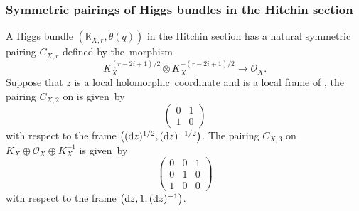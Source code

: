 \documentclass[10pt,a4paper]{amsart}
\numberwithin{equation}{section}
\newcommand{\strsheaf}{\mathcal{O}}
\begin{document}
\subsubsection{Symmetric pairings of Higgs bundles in the Hitchin section}
A Higgs bundle $(\mathbb{K}_{X,r},\theta(q))$ in the Hitchin section has a natural symmetric pairing $C_{X,r}$ defined by the~morphism
\[
K_X^{(r-2i+1)/2} \otimes K_X^{-(r-2i+1)/2} \to \mathcal{O}_X.
\]
 Suppose that $z$ is a local holomorphic~coordinate and  is a local frame of , the pairing $C_{X,2}$ on  is given~by
\begin{equation*}
 \begin{pmatrix}
 0 & 1 \\
 1 & 0
\end{pmatrix}
\end{equation*}
with respect to the frame $\bigl(({\rm d}z)^{1/2},({\rm d}z)^{-1/2}\bigr)$. The pairing $C_{X,3}$ on $K_X\oplus \strsheaf_X \oplus K_X^{-1}$ is given~by
\begin{equation*}
\begin{pmatrix}
 0 & 0 & 1 \\
 0 & 1 & 0 \\
 1 & 0 & 0
\end{pmatrix}
\end{equation*}
with respect to the frame $\bigl({\rm d}z,1,({\rm d}z)^{-1}\bigr)$.
\end{document}
